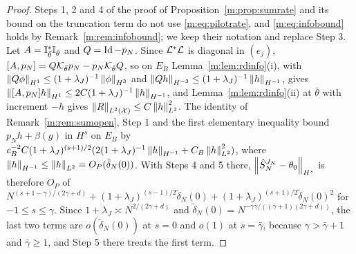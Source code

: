 \begin{proof}
Steps 1, 2 and 4 of the proof of Proposition~\ref{m:prop:sumrate} and its bound on the truncation term do not use \eqref{m:eq:pilotrate}, and \eqref{m:eq:infobound} holds by Remark~\ref{m:rem:infobound}; we keep their notation and replace Step 3. Let $A=\mathbb{I}^*_{\bar\theta}\mathbb{I}_{\bar\theta}$ and $Q=\operatorname{Id}-p_N$. Since $\mathcal{L}^*\mathcal{L}$ is diagonal in $(e_j)$, $[A,p_N]=Q\mathcal{K}_{\bar\theta}p_N-p_N\mathcal{K}_{\bar\theta}Q$, so on $E_B$ Lemma~\ref{m:lem:rdinfo}(i), with $\left\|Q\phi\right\|_{H^1}\le(1+\lambda_J)^{-1}\left\|\phi\right\|_{H^3}$ and $\left\|Qh\right\|_{H^{-3}}\le(1+\lambda_J)^{-1}\left\|h\right\|_{H^{-1}}$, gives $\left\|[A,p_N]h\right\|_{H^1}\le2C(1+\lambda_J)^{-1}\left\|h\right\|_{H^{-1}}$, and Lemma~\ref{m:lem:rdinfo}(ii) at $\bar\theta$ with increment $-h$ gives $\left\|R\right\|_{L^2(\mathcal X)}\le C\left\|h\right\|^2_{L^2}$. The identity of Remark~\ref{m:rem:sumopen}, Step 1 and the first elementary inequality bound $p_Nh+\beta(g)$ in $H^s$ on $E_B$ by $c_B^{-2}C(1+\lambda_J)^{(s+1)/2}(2(1+\lambda_J)^{-1}\left\|h\right\|_{H^{-1}}+C_B\left\|h\right\|^2_{L^2})$, where $\left\|h\right\|_{H^{-1}}\le\left\|h\right\|_{L^2}=O_P(\tilde\delta_N(0))$. With Steps 4 and 5 there, $\left\|\hat S^{J_N}_N-\theta_0\right\|_{H^s}$ is therefore $O_P$ of $N^{(s+1-\gamma)/(2\gamma+d)}+(1+\lambda_J)^{(s-1)/2}\tilde\delta_N(0)+(1+\lambda_J)^{(s+1)/2}\tilde\delta_N(0)^2$ for $-1\le s\le\gamma$. Since $1+\lambda_J\asymp N^{2/(2\gamma+d)}$ and $\tilde\delta_N(0)=N^{-\gamma\bar\gamma/((\bar\gamma+1)(2\gamma+d))}$, the last two terms are $o(\tilde\delta_N(0))$ at $s=0$ and $o(1)$ at $s=\bar\gamma$, because $\gamma>\bar\gamma+1$ and $\bar\gamma\ge1$, and Step 5 there treats the first term.
\end{proof}

